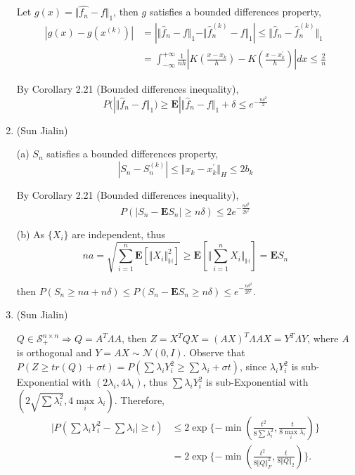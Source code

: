 \begin{enumerate}
	Let $ g(x)=\Vert \hat{f_{n}}-f \Vert_{1} $, then $ g $ satisfies a bounded differences property,
	\[\begin{split}
	|g(x)-g(x^{(k)})|&=|\Vert \hat{f}_{n}-f \Vert_{1}-\Vert \hat{f}^{(k)}_{n}-f \Vert_{1}|\leq
	\Vert \hat{f}_{n}-\hat{f}^{(k)}_{n} \Vert_{1} \\&
	=\int_{-\infty}^{+\infty}\frac{1}{nh}|K(\frac{x-x_{k}}{h})-K(\frac{x-x^{'}_{k}}{h})|dx\leq \frac{2}{n}
	\end{split}  \]
	
	By Corollary 2.21 (Bounded differences inequality),
	\[ P(|\Vert \hat{f}_{n}-f \Vert_{1}) \geq \bm{E}|\Vert \hat{f}_{n}-f \Vert_{1}+\delta \leq e^{-\frac{n\delta^{2}}{2}} \]
	
	\item
	(Sun Jialin)
	
	(a) $ S_{n} $ satisfies a bounded differences property,
	\[ |S_{n}-S^{(k)}_{n}|\leq \Vert x_{k}-x^{'}_{k} \Vert_{H} \leq 2b_{k} \]
	
	By Corollary 2.21 (Bounded differences inequality),
	\[ P(|S_{n}-\bm{E}S_{n}|\geq n\delta) \leq 2e^{-\frac{n\delta^{2}}{2b^{2}}} \]
	
	(b) As $ \{X_{i}\} $ are independent, thus \[ na=\sqrt{\sum_{i=1}^{n}\bm{E}[\Vert X_{i} \Vert^{2}_{\mathbb{H}}]} \geq \bm{E}[\Vert \sum_{i=1}^{n}X_{i} \Vert_{\mathbb{H}}]= \bm{E}S_{n} \]
	
	then $ P(S_{n}\geq na+n\delta) \leq P(S_{n}-\bm{E}S_{n}\geq n\delta) \leq e^{-\frac{n\delta^{2}}{2b^{2}}} $.
	
	\item
	(Sun Jialin)
	
	$ Q \in \mathcal{S}^{n\times n}_{+} \Rightarrow Q=A^{T}\Lambda A $, then $ Z=X^{T}QX=(AX)^{T}\Lambda AX=Y^{T}\Lambda Y $, where $ A $ is orthogonal and $ Y=AX\sim \mathcal{N}(0,I) $. Observe that $ P(Z\geq tr(Q)+\sigma t)=P(\sum \lambda_{i}Y^{2}_{i}\geq \sum \lambda_{i}+\sigma t) $, since $ \lambda_{i}Y^{2}_{i} $ is sub-Exponential with $ (2\lambda_{i},4\lambda_{i}) $, thus $ \sum \lambda_{i}Y^{2}_{i} $ is sub-Exponential with $ (2\sqrt{\sum\lambda^{2}_{i}},4\max \limits_{i} \lambda_{i}) $. Therefore,
	\[\begin{split}
	    |P(\sum \lambda_{i}Y^{2}_{i} - \sum \lambda_{i}| \geq t) & \leq 2\exp\{-\min(\frac{t^{2}}{8\sum\lambda^{2}_{i}},\frac{t}{8\max \limits_{i} \lambda_{i}})\} \\
	    & = 2\exp\{-\min(\frac{t^{2}}{8\Vert Q\Vert^{2}_{F}},\frac{t}{8\Vert Q \Vert_{2}})\}.
	\end{split} \]
	

\end{enumerate}
